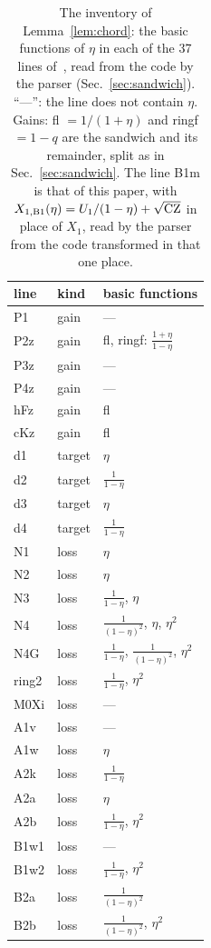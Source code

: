 \begin{table}
\caption{The inventory of Lemma~\ref{lem:chord}: the basic functions of $\eta$ in each of the 37 lines of~\cite{I}, read from the code by the parser (Sec.~\ref{sec:sandwich}). ``---'': the line does not contain $\eta$. Gains: fl $=1/(1+\eta)$ and ringf $=1-q$ are the sandwich and its remainder, split as in Sec.~\ref{sec:sandwich}. The line B1m is that of this paper, with $X_{1,\rm B1}(\eta)=U_1/(1-\eta)+\sqrt{\rm CZ}$ in place of $X_1$, read by the parser from the code transformed in that one place.}
\label{tab:inventory}
\begin{ruledtabular}
\small
\begin{tabular}{lll}
line & kind & basic functions\\ \hline
P1 & gain & ---\\
P2z & gain & fl, ringf: $\frac{1+\eta}{1-\eta}$\\
P3z & gain & ---\\
P4z & gain & ---\\
hFz & gain & fl\\
cKz & gain & fl\\
d1 & target & $\eta$\\
d2 & target & $\frac1{1-\eta}$\\
d3 & target & $\eta$\\
d4 & target & $\frac1{1-\eta}$\\
N1 & loss & $\eta$\\
N2 & loss & $\eta$\\
N3 & loss & $\frac1{1-\eta}$, $\eta$\\
N4 & loss & $\frac1{(1-\eta)^2}$, $\eta$, $\eta^2$\\
N4G & loss & $\frac1{1-\eta}$, $\frac1{(1-\eta)^2}$, $\eta^2$\\
ring2 & loss & $\frac1{1-\eta}$, $\eta^2$\\
M0Xi & loss & ---\\
A1v & loss & ---\\
A1w & loss & $\eta$\\
A2k & loss & $\frac1{1-\eta}$\\
A2a & loss & $\eta$\\
A2b & loss & $\frac1{1-\eta}$, $\eta^2$\\
B1w1 & loss & ---\\
B1w2 & loss & $\frac1{1-\eta}$, $\eta^2$\\
B2a & loss & $\frac1{(1-\eta)^2}$\\
B2b & loss & $\frac1{(1-\eta)^2}$, $\eta^2$\\

\end{tabular}
\end{ruledtabular}
\end{table}
